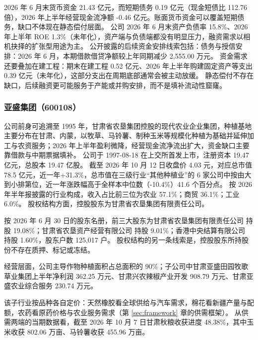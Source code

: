  2026 年 6 月末货币资金 21.43 亿元，而短期债务 0.19 亿元（现金短债比 112.76 倍），2026 年上半年经营现金流净额 -0.46 亿元。账面货币资金可以覆盖短期债务，缺口不体现在静态偿付层面。 公司 2026 年 6 月末资产负债率 15.8\%、2026 年上半年 ROE 1.3\%（未年化），资产端与负债端都没有明显压力，融资需求以相机抉择的扩张型用途为主。 公开披露的后续资金安排线索包括：债务与授信安排：2026 年 6 月，本期借款借贷净额较上年同期减少 2,555.00 万元。 资金需求还要叠加在建工程：期末在建工程 0.52 亿元、2026 年上半年购建固定资产等支出 0.39 亿元（未年化），这部分支出在周期底部通常会被主动放缓。 静态偿付不存在缺口，后续融资更可能服务于产能或并购安排，而不是填补流动性窟窿。




\subsubsection{亚盛集团（600108）}
\label{co:600108}

 公司前身可追溯至 1995 年，甘肃省农垦集团控股的现代农业企业集团，种植基地主要分布在甘肃、内蒙，以牧草、马铃薯、制种玉米等规模化种植为基础并延伸加工与农资服务；2026 年上半年盈利微降，经营现金流净流出扩大，资金缺口主要靠借款与中期票据填补。 公司于 1997-08-18 在上交所首发上市，注册资本 19.47 亿元，总股本 19.47 亿股。 截至 2026 年 10 月 12 日收盘价 4.03 元，对应总市值 78.5 亿元，近一年+31.3\%，总市值在三级行业“其他种植业”的 6 家公司中按由大到小排第位，近一年涨跌幅高于全样本中位数（-10.4\%）41.6 个百分点。 按 2026 年半年报披露的行业构成，收入占比前三位为农业 57.1\%；商贸 36.1\%；工业 6.0\%。 股权结构方面，控股股东为甘肃省农垦集团有限责任公司。

 按 2026 年 6 月 30 日的股东名册，前三大股东为甘肃省农垦集团有限责任公司 持股 19.08\%；甘肃省农垦资产经营有限公司 持股 9.01\%；香港中央结算有限公司 持股 1.60\%，股东户数 125,017 户。 股权结构的另一条线索是，控股股东所持股份不存在质押、标记或冻结。

 经营层面，公司主导作物种植面积占总面积的 90\%；子公司中甘肃亚盛田园牧歌草业集团上半年净利润 362.25 万元、甘肃兴农辣椒产业开发 908.79 万元、甘肃亚盛农业综合服务 230.74 万元。

 该子行业按品种各自定价：天然橡胶看全球供给与汽车需求，棉花看新疆产量与配额，农药看原药价格与农业服务需求（第 \ref{sec:framework} 章的供需框架）。 从供需两端的当期数据看，截至 2026 年 10 月 7 日甘肃秋粮收获进度 48.38\%，其中玉米收获 802.06 万亩、马铃薯收获 455.96 万亩。

